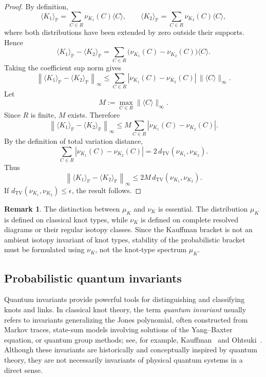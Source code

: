 \documentclass[a4paper, reqno, 12pt]{amsart}
\theoremstyle{plain}
\theoremstyle{definition}
\newtheorem{remark}[theorem]{Remark}
\begin{document}
\begin{proof}
By definition,
\[
\langle K_1\rangle_{\mathbb P}
=
\sum_{C\in R}
\nu_{K_1}(C)\langle C\rangle,
\qquad
\langle K_2\rangle_{\mathbb P}
=
\sum_{C\in R}
\nu_{K_2}(C)\langle C\rangle,
\]
where both distributions have been extended by zero outside their supports. Hence
\[
\langle K_1\rangle_{\mathbb P}
-
\langle K_2\rangle_{\mathbb P}
=
\sum_{C\in R}
\big(\nu_{K_1}(C)-\nu_{K_2}(C)\big)
\langle C\rangle .
\]
Taking the coefficient sup norm gives
\[
\left\|
\langle K_1\rangle_{\mathbb P}
-
\langle K_2\rangle_{\mathbb P}
\right\|_\infty
\le
\sum_{C\in R}
|\nu_{K_1}(C)-\nu_{K_2}(C)|
\,\|\langle C\rangle\|_\infty .
\]
Let
\[
M:=
\max_{C\in R}
\|\langle C\rangle\|_\infty .
\]
Since \(R\) is finite, \(M\) exists. Therefore
\[
\left\|
\langle K_1\rangle_{\mathbb P}
-
\langle K_2\rangle_{\mathbb P}
\right\|_\infty
\le
M
\sum_{C\in R}
|\nu_{K_1}(C)-\nu_{K_2}(C)|.
\]
By the definition of total variation distance,
\[
\sum_{C\in R}
|\nu_{K_1}(C)-\nu_{K_2}(C)|
=
2\,d_{\mathrm{TV}}(\nu_{K_1},\nu_{K_2}).
\]
Thus
\[
\left\|
\langle K_1\rangle_{\mathbb P}
-
\langle K_2\rangle_{\mathbb P}
\right\|_\infty
\le
2M\,d_{\mathrm{TV}}(\nu_{K_1},\nu_{K_2}).
\]
If \(d_{\mathrm{TV}}(\nu_{K_1},\nu_{K_2})\le \epsilon\), the result follows.
\end{proof}

\begin{remark}\rm
The distinction between \(\mu_K\) and \(\nu_K\) is essential. The distribution \(\mu_K\) is defined on classical knot types, while \(\nu_K\) is defined on complete resolved diagrams or their regular isotopy classes. Since the Kauffman bracket is not an ambient isotopy invariant of knot types, stability of the probabilistic bracket must be formulated using \(\nu_K\), not the knot-type spectrum \(\mu_K\).
\end{remark}






\subsection{Probabilistic quantum invariants}


Quantum invariants provide powerful tools for distinguishing and classifying knots and links. In classical knot theory, the term \emph{quantum invariant} usually refers to invariants generalizing the Jones polynomial, often constructed from Markov traces, state-sum models involving solutions of the Yang--Baxter equation, or quantum group methods; see, for example, Kauffman~\cite{KauffmanKnotsPhysics} and Ohtsuki~\cite{OhtsukiQuantumInvariants}. 
Although these invariants are historically and conceptually inspired by quantum theory, they are not necessarily invariants of physical quantum systems in a direct sense.
\end{document}
